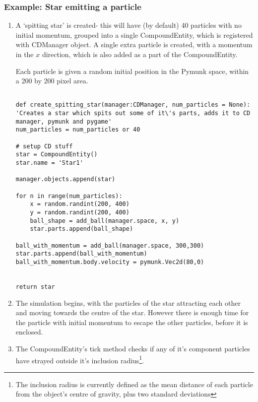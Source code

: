 \documentclass[dissertation.tex]{subfiles}
\begin{document}
    \subsubsection{Example: Star emitting a particle}
    \begin{enumerate}
        \item A `spitting star' is created- this will have (by default) 40 particles with no initial momentum, grouped into a single CompoundEntity, which is registered with CDManager object. A single extra particle is created, with a momentum in the \(x\) direction, which is also added  as a part of the CompoundEntity.
        
        Each particle is given a random initial position in the Pymunk space, within a 200 by 200 pixel area.


\begin{lstlisting}[frame=single,caption={CDUtilities.create\_spitting\_star}]

def create_spitting_star(manager:CDManager, num_particles = None):
'Creates a star which spits out some of it\'s parts, adds it to CD manager, pymunk and pygame'
num_particles = num_particles or 40

# setup CD stuff
star = CompoundEntity()
star.name = 'Star1'

manager.objects.append(star)

for n in range(num_particles):
    x = random.randint(200, 400)
    y = random.randint(200, 400)
    ball_shape = add_ball(manager.space, x, y)
    star.parts.append(ball_shape)

ball_with_momentum = add_ball(manager.space, 300,300)
star.parts.append(ball_with_momentum)
ball_with_momentum.body.velocity = pymunk.Vec2d(80,0)


return star
    \end{lstlisting}

    \item The simulation begins, with the particles of the star attracting each other and moving towards the centre of the star. However there is enough time for the particle with initial momentum to escape the other particles, before it is enclosed.

    \item The CompoundEntity's tick method checks if any of it's component particles have strayed outside it's inclusion radius\footnote{The inclusion radius is currently defined as the mean distance of each particle from the object's centre of gravity, plus two standard deviations}.


\end{enumerate}
\end{document}
